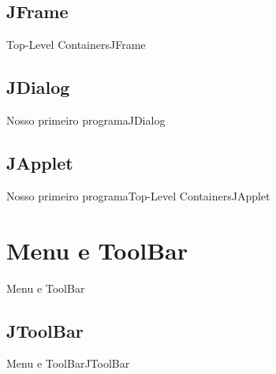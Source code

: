 \documentclass[10pt]{beamer}
\begin{document}
\subsection{JFrame}
\begin{frame}{Top-Level Containers}{JFrame}

\end{frame}{}
{}

\subsection{JDialog}
\begin{frame}{Nosso primeiro programa}{JDialog}
\end{frame}{}

\subsection{JApplet}
\begin{frame}{Nosso primeiro programa}{Top-Level Containers}{JApplet}
\end{frame}{}


\section{Menu e ToolBar}
\begin{frame}{Menu e ToolBar}{}
\end{frame}{}

\subsection{JToolBar}
\begin{frame}{Menu e ToolBar}{JToolBar}
\end{frame}{}
\end{document}
